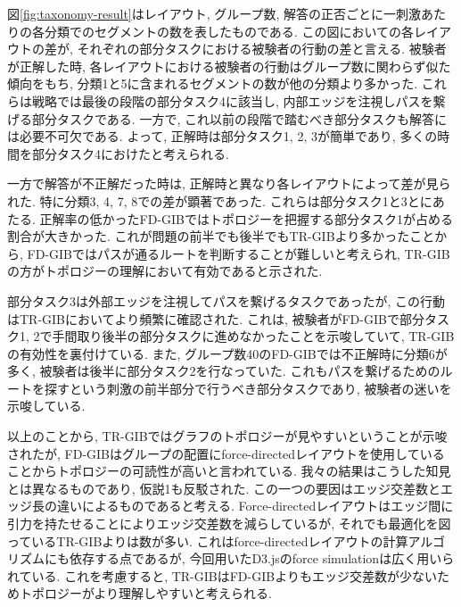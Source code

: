 \documentclass{kuee}
\begin{document}
図\ref{fig:taxonomy-result}はレイアウト, グループ数, 解答の正否ごとに一刺激あたりの各分類でのセグメントの数を表したものである.
この図においての各レイアウトの差が, それぞれの部分タスクにおける被験者の行動の差と言える.
被験者が正解した時, 各レイアウトにおける被験者の行動はグループ数に関わらず似た傾向をもち, 分類1と5に含まれるセグメントの数が他の分類より多かった.
これらは戦略では最後の段階の部分タスク4に該当し, 内部エッジを注視しパスを繋げる部分タスクである.
一方で, これ以前の段階で踏むべき部分タスクも解答には必要不可欠である.
よって, 正解時は部分タスク1, 2, 3が簡単であり, 多くの時間を部分タスク4におけたと考えられる.

一方で解答が不正解だった時は, 正解時と異なり各レイアウトによって差が見られた.
特に分類3, 4, 7, 8での差が顕著であった.
これらは部分タスク1と3とにあたる.
正解率の低かったFD-GIBではトポロジーを把握する部分タスク1が占める割合が大きかった.
これが問題の前半でも後半でもTR-GIBより多かったことから, FD-GIBではパスが通るルートを判断することが難しいと考えられ, TR-GIBの方がトポロジーの理解において有効であると示された.

部分タスク3は外部エッジを注視してパスを繋げるタスクであったが, この行動はTR-GIBにおいてより頻繁に確認された.
これは, 被験者がFD-GIBで部分タスク1, 2で手間取り後半の部分タスクに進めなかったことを示唆していて, TR-GIBの有効性を裏付けている.
また, グループ数40のFD-GIBでは不正解時に分類6が多く, 被験者は後半に部分タスク2を行なっていた.
これもパスを繋げるためのルートを探すという刺激の前半部分で行うべき部分タスクであり, 被験者の迷いを示唆している.


以上のことから, TR-GIBではグラフのトポロジーが見やすいということが示唆されたが, FD-GIBはグループの配置にforce-directedレイアウトを使用していることからトポロジーの可読性が高いと言われている\cite{Kobourov2013ForceDirectedDA}.
我々の結果はこうした知見とは異なるものであり, 仮説1も反駁された.
この一つの要因はエッジ交差数とエッジ長の違いによるものであると考える.
Force-directedレイアウトはエッジ間に引力を持たせることによりエッジ交差数を減らしているが, それでも最適化を図っているTR-GIBよりは数が多い.
これはforce-directedレイアウトの計算アルゴリズムにも依存する点であるが, 今回用いたD3.jsのforce simulation\cite{Bostock:2011:DDD:2068462.2068631}は広く用いられている.
これを考慮すると, TR-GIBはFD-GIBよりもエッジ交差数が少ないためトポロジーがより理解しやすいと考えられる.
\end{document}
